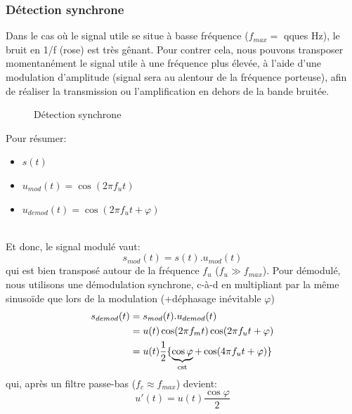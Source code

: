 \subsubsection{Détection synchrone} \label{subsubsec:detectsync}
Dans le cas où le signal utile se situe à basse fréquence (\(f_{max}=\) qques \si{\Hz}), le bruit en 1/f (rose) est très gênant. Pour contrer cela, nous pouvons transposer momentanément le signal utile à une fréquence plus élevée, à l'aide d'une modulation d'amplitude (signal sera au alentour de la fréquence porteuse), afin de réaliser la transmission ou l'amplification en dehors de la bande bruitée. 
\begin{figure}[H] 
	\centering 
	\caption{Détection synchrone} 
\end{figure}
Pour résumer:
\begin{itemize}
		\item { \(s(t)\)}
		\item { \(u_{mod}(t)=\cos(2\pi f_ut)\)}
		\item { \(u_{demod}(t) = \cos(2\pi f_ut+\varphi)\)}
\end{itemize}\ \\
Et donc, le signal modulé vaut:
\begin{equation}
s_{mod}(t) = s(t) . u_{mod}(t)
\end{equation}
qui est bien transposé autour de la fréquence \(f_u\) (\(f_u\gg f_{max}\)). Pour démodulé, nous utilisons une démodulation synchrone, c-à-d en multipliant par la même sinusoïde que lors de la modulation (+déphasage inévitable \(\varphi\))
\begin{equation}
\begin{split}
s_{demod}(t) &= s_{mod}(t) . u_{demod}(t)\\
&= u(t)\cos(2\pi f_m t)\cos(2\pi f_u t+\varphi)\\
&= u(t)\frac{1}{2}\{\underbrace{\cos\varphi}_{\cst}+\cos(4\pi f_u t+\varphi)\}
\end{split}
\end{equation}
qui, après un filtre passe-bas (\(f_c \approx f_{max}\)) devient:
\begin{equation}
u'(t) = u(t)\frac{\cos\varphi}{2}
\end{equation}
